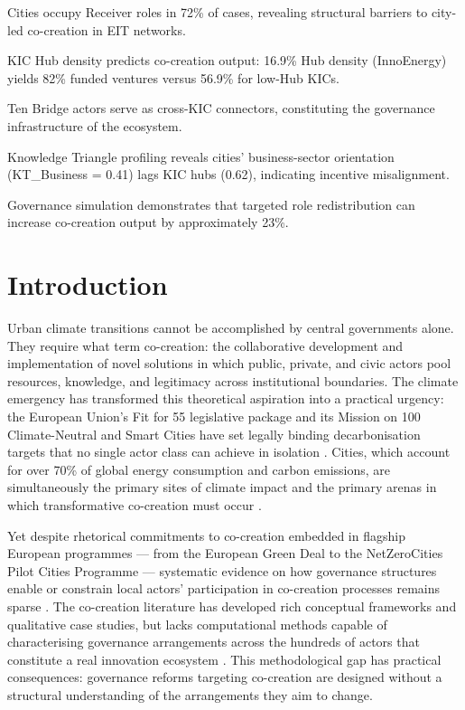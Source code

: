 \documentclass[review,12pt]{elsarticle}
\begin{document}
\begin{frontmatter}
\begin{highlights}
\item Cities occupy Receiver roles in 72\% of cases, revealing structural barriers to city-led co-creation in EIT networks.
\item KIC Hub density predicts co-creation output: 16.9\% Hub density (InnoEnergy) yields 82\% funded ventures versus 56.9\% for low-Hub KICs.
\item Ten Bridge actors serve as cross-KIC connectors, constituting the governance infrastructure of the ecosystem.
\item Knowledge Triangle profiling reveals cities' business-sector orientation (KT\_Business = 0.41) lags KIC hubs (0.62), indicating incentive misalignment.
\item Governance simulation demonstrates that targeted role redistribution can increase co-creation output by approximately 23\%.
\end{highlights}

\end{frontmatter}

\section{Introduction}
\label{sec:intro}

Urban climate transitions cannot be accomplished by central governments alone. They require what \citet{ansell2021co} term co-creation: the collaborative development and implementation of novel solutions in which public, private, and civic actors pool resources, knowledge, and legitimacy across institutional boundaries. The climate emergency has transformed this theoretical aspiration into a practical urgency: the European Union's Fit for 55 legislative package and its Mission on 100 Climate-Neutral and Smart Cities have set legally binding decarbonisation targets that no single actor class can achieve in isolation \citep{european2021fit, mazzucato2018mission}. Cities, which account for over 70\% of global energy consumption and carbon emissions, are simultaneously the primary sites of climate impact and the primary arenas in which transformative co-creation must occur \citep{bulkeley2013urban}.

Yet despite rhetorical commitments to co-creation embedded in flagship European programmes --- from the European Green Deal to the NetZeroCities Pilot Cities Programme --- systematic evidence on how governance structures enable or constrain local actors' participation in co-creation processes remains sparse \citep{holscher2018navigating, sorensen2017metagovernance}. The co-creation literature has developed rich conceptual frameworks and qualitative case studies, but lacks computational methods capable of characterising governance arrangements across the hundreds of actors that constitute a real innovation ecosystem \citep{grimmer2021machine}. This methodological gap has practical consequences: governance reforms targeting co-creation are designed without a structural understanding of the arrangements they aim to change.
\end{document}
